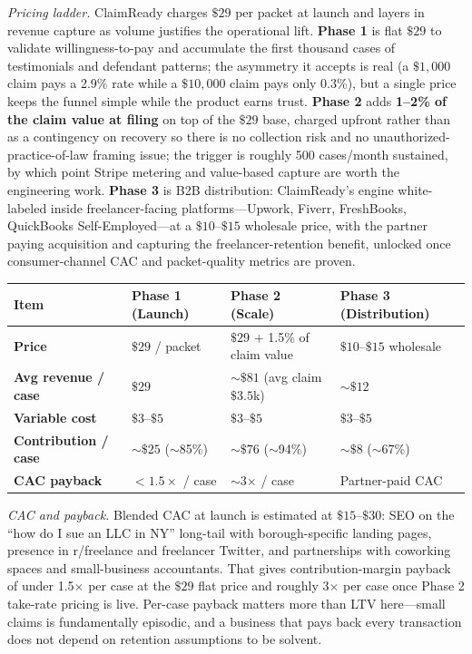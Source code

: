 \documentclass[11pt]{article}
\begin{document}
{\itshape Pricing ladder.} ClaimReady charges \(\$29\) per packet at launch and layers in revenue capture as volume justifies the operational lift. \textbf{Phase 1} is flat \(\$29\) to validate willingness-to-pay and accumulate the first thousand cases of testimonials and defendant patterns; the asymmetry it accepts is real (a \(\$1{,}000\) claim pays a 2.9\% rate while a \(\$10{,}000\) claim pays only 0.3\%), but a single price keeps the funnel simple while the product earns trust. \textbf{Phase 2} adds \textbf{1--2\% of the claim value at filing} on top of the \(\$29\) base, charged upfront rather than as a contingency on recovery so there is no collection risk and no unauthorized-practice-of-law framing issue; the trigger is roughly 500 cases/month sustained, by which point Stripe metering and value-based capture are worth the engineering work. \textbf{Phase 3} is B2B distribution: ClaimReady's engine white-labeled inside freelancer-facing platforms---Upwork, Fiverr, FreshBooks, QuickBooks Self-Employed---at a \(\$10\)--\(\$15\) wholesale price, with the partner paying acquisition and capturing the freelancer-retention benefit, unlocked once consumer-channel CAC and packet-quality metrics are proven.

\vspace{-1pt}
\begin{center}
\begin{tabular}{>{\bfseries}p{1.20in}p{1.50in}p{1.65in}p{1.65in}}
\toprule
Item & Phase 1 (Launch) & Phase 2 (Scale) & Phase 3 (Distribution) \\
\midrule
Price & \(\$29\) / packet & \(\$29\) + 1.5\% of claim value & \(\$10\)--\(\$15\) wholesale \\
Avg revenue / case & \(\$29\) & \(\sim\$81\) (avg claim \(\$3.5\)k) & \(\sim\$12\) \\
Variable cost & \(\$3\)--\(\$5\) & \(\$3\)--\(\$5\) & \(\$3\)--\(\$5\) \\
Contribution / case & \(\sim\$25\) (\(\sim\)85\%) & \(\sim\$76\) (\(\sim\)94\%) & \(\sim\$8\) (\(\sim\)67\%) \\
CAC payback & \(<1.5\times\) / case & \(\sim\)3\(\times\) / case & Partner-paid CAC \\
\bottomrule
\end{tabular}
\end{center}
\vspace{-1pt}

{\itshape CAC and payback.} Blended CAC at launch is estimated at \(\$15\)--\(\$30\): SEO on the ``how do I sue an LLC in NY'' long-tail with borough-specific landing pages, presence in r/freelance and freelancer Twitter, and partnerships with coworking spaces and small-business accountants. That gives contribution-margin payback of under 1.5\(\times\) per case at the \(\$29\) flat price and roughly 3\(\times\) per case once Phase 2 take-rate pricing is live. Per-case payback matters more than LTV here---small claims is fundamentally episodic, and a business that pays back every transaction does not depend on retention assumptions to be solvent.
\end{document}
